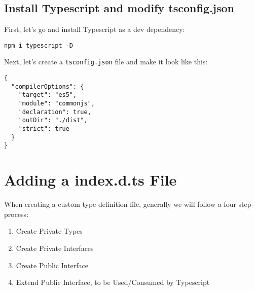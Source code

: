 \subsection{Install Typescript and modify tsconfig.json}
First, let's go and install Typescript as a dev dependency: 
\begin{verbatim}
npm i typescript -D  
\end{verbatim}

Next, let's create a \lstinline{tsconfig.json} file and make it look like this:
\begin{lstlisting}
{
  "compilerOptions": {
    "target": "es5",
    "module": "commonjs",
    "declaration": true,
    "outDir": "./dist",
    "strict": true
  }
}  
\end{lstlisting}

\section{Adding a index.d.ts File}
When creating a custom type definition file, generally we will follow a four
step process:
\begin{enumerate}
  \item Create Private Types
  \item Create Private Interfaces
  \item Create Public Interface 
  \item Extend Public Interface, to be Used/Consumed by Typescript
\end{enumerate}

